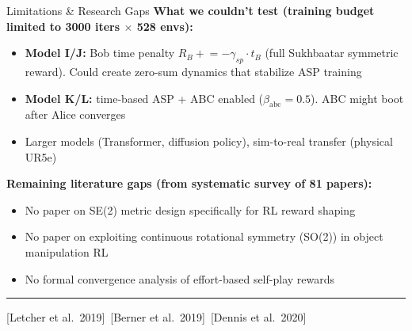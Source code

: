 \documentclass[aspectratio=169,xcolor=dvipsnames,t]{beamer}
\newcommand{\litfooter}[1]{%
  \vspace{2pt}%
  \hrule%
  \vspace{2pt}%
  {\tiny\color{LightDarkGrey} #1}%
}
\begin{document}
\begin{frame}[t]{Limitations \& Research Gaps}
  \textbf{What we couldn't test (training budget limited to 3000 iters $\times$ 528 envs):}
  \begin{itemize}
    \item \textbf{Model I/J:} Bob time penalty $R_B \mathrel{+}= -\gamma_{sp}\!\cdot\!t_B$ (full Sukhbaatar symmetric reward). Could create zero-sum dynamics that stabilize ASP training
    \item \textbf{Model K/L:} time-based ASP + ABC enabled ($\beta_{\text{abc}}=0.5$). ABC might boot after Alice converges
    \item Larger models (Transformer, diffusion policy), sim-to-real transfer (physical UR5e)
  \end{itemize}

  \vspace{1pt}
  \textbf{Remaining literature gaps (from systematic survey of 81 papers):}
  \begin{itemize}
    \item No paper on SE(2) metric design specifically for RL reward shaping
    \item No paper on exploiting continuous rotational symmetry (SO(2)) in object manipulation RL
    \item No formal convergence analysis of effort-based self-play rewards
  \end{itemize}

  \vfill\litfooter{[Letcher et al.\ 2019]~[Berner et al.\ 2019]~[Dennis et al.\ 2020]}
\end{frame}
\end{document}
